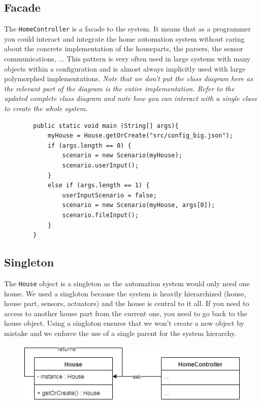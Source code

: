       \subsection{Facade}
        The \texttt{HomeController} is a facade to the system. It means that as a programmer you could interact and integrate the home automation system without caring about the concrete implementation of the houseparts, the parsers, the sensor communications, ... This pattern is very often used in large systems with many objects within a configuration and is almost always implicitly used with large polymorphed implementations. \emph{Note that we don't put the class diagram here as the relevant part of the diagram is the entire implementation. Refer to the updated complete class diagram and note how you can interact with a single class to create the whole system.}

        \begin{verbatim}
        public static void main (String[] args){
            myHouse = House.getOrCreate("src/config_big.json");
            if (args.length == 0) {
                scenario = new Scenario(myHouse);
                scenario.userInput();
            }
            else if (args.length == 1) {
                userInputScenario = false;
                scenario = new Scenario(myHouse, args[0]);
                scenario.fileInput();
            }
        }
        \end{verbatim}
      \subsection{Singleton}
        The \texttt{House} object is a singleton as the automation system would only need one house. We used a singloton because the system is heavily hierarchized (house, house part, sensors, actuators) and the house is central to it all. If you need to access to another house part from the current one, you need to go back to the house object. Using a singloton ensures that we won't create a new object by mistake and we enforce the use of a single parent for the system hierarchy.

        \begin{figure}[!h]
          \includegraphics[scale=0.75]{singletonhouse.png}
        \end{figure}

